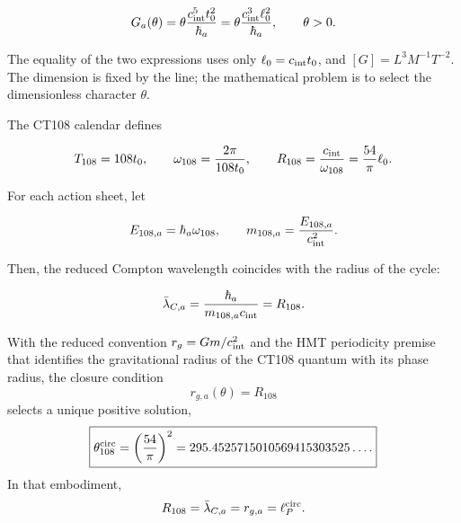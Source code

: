 \begin{equation}
\label{rm:eq:gravity-transducer}
G_a(\theta)
=\theta\frac{c_{\rm int}^{5}t_0^2}{\hbar_a}
=\theta\frac{c_{\rm int}^{3}\ell_0^2}{\hbar_a},
\qquad \theta>0.
\end{equation}

The equality of the two expressions uses only
\(\ell_0=c_{\rm int}t_0\), and
\([G]=L^3M^{-1}T^{-2}\). The dimension is fixed by the line; the
mathematical problem is to select the dimensionless character \(\theta\).

The CT108 calendar defines

\begin{equation}
\label{rm:eq:gravity-clock108}
T_{108}=108t_0,
\qquad
\omega_{108}=\frac{2\pi}{108t_0},
\qquad
R_{108}=\frac{c_{\rm int}}{\omega_{108}}
=\frac{54}{\pi}\ell_0.
\end{equation}

For each action sheet, let

\begin{equation}
\label{rm:eq:gravity-clock-energy-mass}
E_{108,a}=\hbar_a\omega_{108},
\qquad
m_{108,a}=\frac{E_{108,a}}{c_{\rm int}^2}.
\end{equation}

Then, the reduced Compton wavelength coincides with the radius of the cycle:

\begin{equation}
\label{rm:eq:gravity-compton-clock}
\bar\lambda_{C,a}
=\frac{\hbar_a}{m_{108,a}c_{\rm int}}
=R_{108}.
\end{equation}

\begin{theorem}
\label{rm:thm:gravity-circular-selector}
With the reduced convention
\(r_g=Gm/c_{\rm int}^2\) and the HMT periodicity premise that identifies the gravitational
radius of the CT108 quantum with its phase radius, the closure condition
\begin{equation}
\label{rm:eq:gravity-closing-condition}
r_{g,a}(\theta)=R_{108}
\end{equation}
selects a unique positive solution,
\begin{equation}
\label{rm:eq:gravity-theta108}
\boxed{
\theta_{108}^{\rm circ}=\left(\frac{54}{\pi}\right)^2
=295.4525715010569415303525\ldots .}
\end{equation}
In that embodiment,
\begin{equation}
\label{rm:eq:gravity-four-lengths}
R_{108}=\bar\lambda_{C,a}=r_{g,a}=\ell_P^{\rm circ}.
\end{equation}
\end{theorem}

